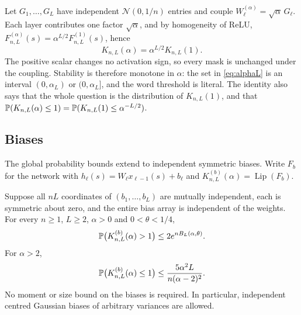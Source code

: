 Let $G_1,\dots,G_L$ have independent $\mathcal N(0,1/n)$ entries and couple $W^{(\alpha)}_\ell=\sqrt\alpha\,G_\ell$. Each layer contributes one factor $\sqrt\alpha$, and by homogeneity of ReLU, $F^{(\alpha)}_{n,L}(s)=\alpha^{L/2}F^{(1)}_{n,L}(s)$, hence
\begin{equation}\label{eq:scaling}
K_{n,L}(\alpha)=\alpha^{L/2}K_{n,L}(1).
\end{equation}
The positive scalar changes no activation sign, so every mask is unchanged under the coupling. Stability is therefore monotone in $\alpha$: the set in \cref{eq:alphaL} is an interval $(0,\alpha_L)$ or $(0,\alpha_L]$, and the word threshold is literal. The identity also says that the whole question is the distribution of $K_{n,L}(1)$, and that $\mathbb{P}(K_{n,L}(\alpha)\le1)=\mathbb{P}(K_{n,L}(1)\le\alpha^{-L/2})$.

\subsection{Biases}
\label{sec:biases}

The global probability bounds extend to independent symmetric biases. Write $F_b$ for the network with $h_\ell(s)=W_\ell x_{\ell-1}(s)+b_\ell$ and $K^{(b)}_{n,L}(\alpha)=\operatorname{Lip}(F_b)$.

\begin{theorem}\label{thm:bias}
Suppose all $nL$ coordinates of $(b_1,\dots,b_L)$ are mutually independent, each is symmetric about zero, and the entire bias array is independent of the weights. For every $n\ge1$, $L\ge2$, $\alpha>0$ and $0<\theta<1/4$,
\[
\mathbb{P}\bigl(K^{(b)}_{n,L}(\alpha)>1\bigr)\le2e^{nB_L(\alpha,\theta)}.
\]
For $\alpha>2$,
\[
\mathbb{P}\bigl(K^{(b)}_{n,L}(\alpha)\le1\bigr)\le\frac{5\alpha^2L}{n(\alpha-2)^2}.
\]
No moment or size bound on the biases is required. In particular, independent centred Gaussian biases of arbitrary variances are allowed.
\end{theorem}

